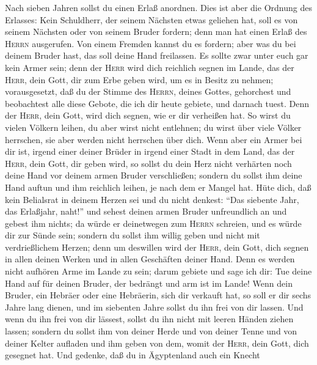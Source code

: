  Nach sieben Jahren sollst du einen Erlaß anordnen. Dies
ist aber die Ordnung des Erlasses:  Kein Schuldherr, der
seinem Nächsten etwas geliehen hat, soll es von seinem Nächsten oder von
seinem Bruder fordern; denn man hat einen Erlaß des \textsc{Herrn}
ausgerufen.  Von einem Fremden kannst du es fordern; aber
was du bei deinem Bruder hast, das soll deine Hand freilassen.
 Es sollte zwar unter euch gar kein Armer sein; denn der
\textsc{Herr} wird dich reichlich segnen im Lande, das der
\textsc{Herr}, dein Gott, dir zum Erbe geben wird, um es in Besitz zu
nehmen;  vorausgesetzt, daß du der Stimme des
\textsc{Herrn}, deines Gottes, gehorchest und beobachtest alle diese
Gebote, die ich dir heute gebiete, und darnach tuest. 
Denn der \textsc{Herr}, dein Gott, wird dich segnen, wie er dir
verheißen hat. So wirst du vielen Völkern leihen, du aber wirst nicht
entlehnen; du wirst über viele Völker herrschen, sie aber werden nicht
herrschen über dich.  Wenn aber ein Armer bei dir ist,
irgend einer deiner Brüder in irgend einer Stadt in dem Land, das der
\textsc{Herr}, dein Gott, dir geben wird, so sollst du dein Herz nicht
verhärten noch deine Hand vor deinem armen Bruder verschließen;
 sondern du sollst ihm deine Hand auftun und ihm reichlich
leihen, je nach dem er Mangel hat.  Hüte dich, daß kein
Belialsrat in deinem Herzen sei und du nicht denkest: ``Das siebente
Jahr, das Erlaßjahr, naht!'' und sehest deinen armen Bruder unfreundlich
an und gebest ihm nichts; da würde er deinetwegen zum \textsc{Herrn}
schreien, und es würde dir zur Sünde sein;  sondern du
sollst ihm willig geben und nicht mit verdrießlichem Herzen; denn um
deswillen wird der \textsc{Herr}, dein Gott, dich segnen in allen deinen
Werken und in allen Geschäften deiner Hand.  Denn es
werden nicht aufhören Arme im Lande zu sein; darum gebiete und sage ich
dir: Tue deine Hand auf für deinen Bruder, der bedrängt und arm ist im
Lande!  Wenn dein Bruder, ein Hebräer oder eine
Hebräerin, sich dir verkauft hat, so soll er dir sechs Jahre lang
dienen, und im siebenten Jahre sollst du ihn frei von dir lassen.
 Und wenn du ihn frei von dir lässest, sollst du ihn
nicht mit leeren Händen ziehen lassen;  sondern du sollst
ihm von deiner Herde und von deiner Tenne und von deiner Kelter aufladen
und ihm geben von dem, womit der \textsc{Herr}, dein Gott, dich gesegnet
hat.  Und gedenke, daß du in Ägyptenland auch ein Knecht
